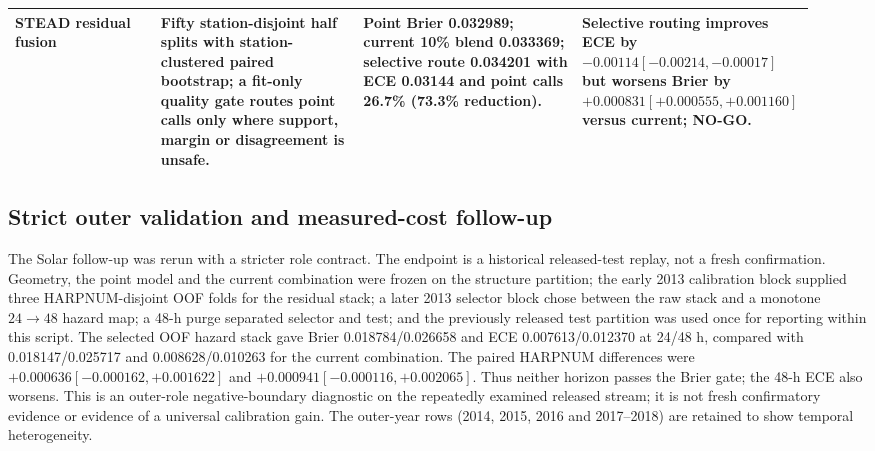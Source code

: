 \documentclass[11pt,a4paper]{article}
\numberwithin{equation}{section}
\theoremstyle{definition}\newtheorem{definition}[theorem]{Definition}
\theoremstyle{remark}\newtheorem{remark}[theorem]{Remark}
\begin{document}
\begin{table}[H]
\begin{tabular}{p{0.18\linewidth}p{0.25\linewidth}p{0.27\linewidth}p{0.23\linewidth}}
STEAD residual fusion & Fifty station-disjoint half splits with station-clustered paired bootstrap; a fit-only quality gate routes point calls only where support, margin or disagreement is unsafe. & Point Brier 0.032989; current 10\% blend 0.033369; selective route 0.034201 with ECE 0.03144 and point calls 26.7\% (73.3\% reduction). & Selective routing improves ECE by $-0.00114[-0.00214,-0.00017]$ but worsens Brier by $+0.000831[+0.000555,+0.001160]$ versus current; NO-GO. \\
\bottomrule
\end{tabular}
\end{table}

\subsection{Strict outer validation and measured-cost follow-up}
\label{sec:strictfollowup}
The Solar follow-up was rerun with a stricter role contract. The endpoint is a historical released-test replay, not a fresh confirmation. Geometry, the point model and the current combination were frozen on the structure partition; the early 2013 calibration block supplied three HARPNUM-disjoint OOF folds for the residual stack; a later 2013 selector block chose between the raw stack and a monotone $24\rightarrow48$ hazard map; a 48-h purge separated selector and test; and the previously released test partition was used once for reporting within this script. The selected OOF hazard stack gave Brier 0.018784/0.026658 and ECE 0.007613/0.012370 at 24/48 h, compared with 0.018147/0.025717 and 0.008628/0.010263 for the current combination. The paired HARPNUM differences were $+0.000636[-0.000162,+0.001622]$ and $+0.000941[-0.000116,+0.002065]$. Thus neither horizon passes the Brier gate; the 48-h ECE also worsens. This is an outer-role negative-boundary diagnostic on the repeatedly examined released stream; it is not fresh confirmatory evidence or evidence of a universal calibration gain. The outer-year rows (2014, 2015, 2016 and 2017--2018) are retained to show temporal heterogeneity.
\end{document}
